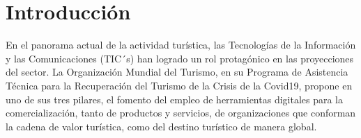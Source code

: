%
\chapter*{Introducción}



 

 




En el panorama actual de la actividad turística, las Tecnologías de la Información y las Comunicaciones (TIC´s) han logrado un rol protagónico en las proyecciones del sector. La Organización Mundial del Turismo, en su Programa de Asistencia Técnica para la Recuperación del Turismo de la Crisis de la Covid19, propone en uno de sus tres pilares, el fomento del empleo de herramientas digitales para la comercialización, tanto de productos y servicios, de organizaciones que conforman la cadena de valor turística, como del destino turístico de manera global.

\vspace*{1.5em}


